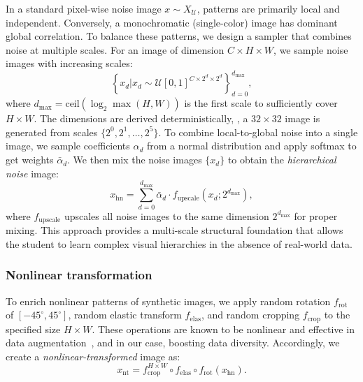 \begin{foldable} %
  In a standard pixel-wise noise image $x \sim X_\mathcal{U}$, patterns are primarily local and independent.
  Conversely, a monochromatic (single-color) image has dominant global correlation.
  To balance these patterns, we design a sampler that combines noise at multiple scales.
  For an image of dimension $C \times H \times W$, we sample noise images with increasing scales:
  \begin{equation} \label{eq:synthesis-hiernoise-multiscale}
    \left\{ x_{d} |x_{d} \sim \mathcal{U}[0,1]^{C\times2^{d}\times2^{d}} \right\}_{d=0}^{d_\text{max}},
  \end{equation}
  where $d_\text{max} = \text{ceil}(\log_{2} \max(H, W))$ is the first scale to sufficiently cover $H\times W$.
  The dimensions are derived deterministically, \eg, a $32 \times 32$ image is generated from scales $\{2^0, 2^1, \ldots, 2^5\}$.
  To combine local-to-global noise into a single image, we sample coefficients $\alpha_d$ from a normal distribution and apply softmax to get weights $\bar{\alpha}_{d}$.
  We then mix the noise images $\{x_d\}$ to obtain the \textit{hierarchical noise} image:
  \begin{equation} \label{eq:synthesis-hiernoise-combine}
    x_\text{hn} = \sum_{d=0}^{d_\text{max}} \bar{\alpha}_{d} \cdot f_\text{upscale}\left(x_{d};2^{d_\text{max}}\right),
  \end{equation}
  where $f_\text{upscale}$ upscales all noise images to the same dimension $2^{d_\text{max}}$ for proper mixing.
  This approach provides a multi-scale structural foundation that allows the student to learn complex visual hierarchies in the absence of real-world data.
\end{foldable}

\subsubsection{Nonlinear transformation} \label{sec:03-framework-synthesis-nonlintrans}
\begin{foldable} %
  To enrich nonlinear patterns of synthetic images, we apply random rotation $f_\text{rot}$ of $[-45^{\circ}, 45^{\circ}]$, random elastic transform $f_\text{elas}$, and random cropping $f_\text{crop}$ to the specified size $H \times W$.
  These operations are known to be nonlinear and effective in data augmentation~\cite{simard2003best}, and in our case, boosting data diversity.
  Accordingly, we create a \textit{nonlinear-transformed} image as:
  \begin{equation} \label{eq:synthesis-nonlintrans}
    x_\text{nt} = f_\text{crop}^{H\times W} \circ f_\text{elas} \circ f_\text{rot} (x_\text{hn}).
  \end{equation}
\end{foldable}

